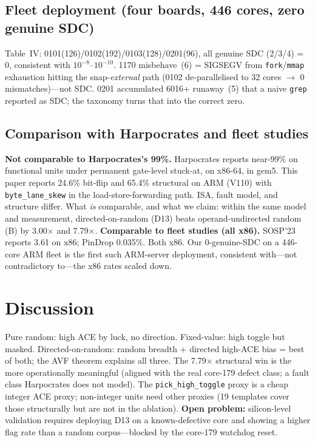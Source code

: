 \documentclass[sigplan,review,anonymous]{acmart}
\begin{document}
\subsection{Fleet deployment (four boards, 446 cores, zero genuine SDC)}
Table~IV: 0101(126)/0102(192)/0103(128)/0201(96), all genuine SDC (2/3/4) = 0, consistent with $10^{-8}$--$10^{-10}$. 1170 misbehave~(6) = SIGSEGV from \texttt{fork}/\texttt{mmap} exhaustion hitting the snap-\emph{external} path (0102 de-parallelised to 32 cores $\to$ 0 mismatches)---not SDC. 0201 accumulated 6016+ runaway~(5) that a naive \texttt{grep} reported as SDC; the taxonomy turns that into the correct zero.

\subsection{Comparison with Harpocrates and fleet studies}
\textbf{Not comparable to Harpocrates's 99\%.} Harpocrates reports near-99\% on functional units under permanent gate-level stuck-at, on x86-64, in gem5. This paper reports 24.6\% bit-flip and 65.4\% structural on ARM (V110) with \texttt{byte\_lane\_skew} in the load-store-forwarding path. ISA, fault model, and structure differ. What \emph{is} comparable, and what we claim: within the same model and measurement, directed-on-random (D13) beats operand-undirected random (B) by 3.00$\times$ and 7.79$\times$. \textbf{Comparable to fleet studies (all x86).} SOSP'23 reports 3.61\textperthousand{} on x86; PinDrop 0.035\%. Both x86. Our 0-genuine-SDC on a 446-core ARM fleet is the first such ARM-server deployment, consistent with---not contradictory to---the x86 rates scaled down.

\section{Discussion}
\label{sec:discussion}
Pure random: high ACE by luck, no direction. Fixed-value: high toggle but masked. Directed-on-random: random breadth + directed high-ACE bias = best of both; the AVF theorem explains all three. The 7.79$\times$ structural win is the more operationally meaningful (aligned with the real core-179 defect class; a fault class Harpocrates does not model). The \texttt{pick\_high\_toggle} proxy is a cheap integer ACE proxy; non-integer units need other proxies (19 templates cover those structurally but are not in the ablation). \textbf{Open problem:} silicon-level validation requires deploying D13 on a known-defective core and showing a higher flag rate than a random corpus---blocked by the core-179 watchdog reset.
\end{document}
